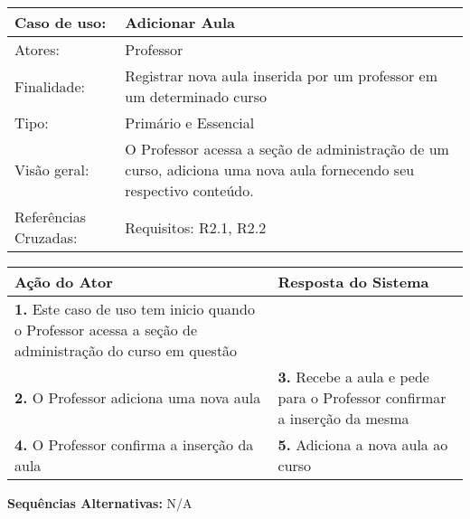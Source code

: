 \documentclass[12pt,a4paper,onecolumn,titlepage]{article}
\begin{document}
\begin{table}[h!]
\begin{center}
\begin{tabular}{p{2.5cm} p{9.5cm}}
Caso de uso: & \textbf{Adicionar Aula} \\ \hline
Atores: & Professor \\ \hline
Finalidade: & Registrar nova aula inserida por um professor em um determinado curso\\ \hline
Tipo: & Primário e Essencial \\ \hline
Visão geral: & O Professor acessa a seção de administração de um curso, adiciona uma nova aula fornecendo seu respectivo conteúdo. \\ \hline
Referências Cruzadas: & Requisitos: R2.1, R2.2\\

\end{tabular}
\end{center}
\end{table} 

\begin{center}
\def\arraystretch{1.1}
\begin{tabular}{|p{6cm}|p{6cm}|}

\hline
\textbf{Ação do Ator} & \textbf{Resposta do Sistema} \\ \hline
\textbf{1.} Este caso de uso tem inicio quando o Professor acessa a seção de administração do curso em questão  & \\ \hline
\textbf{2.} O Professor adiciona uma nova aula  & \textbf{3.} Recebe a aula e pede para o Professor confirmar a inserção da mesma  \\ \hline
\textbf{4.} O Professor confirma a inserção da aula  & \textbf{5.} Adiciona a nova aula ao curso\\ \hline
\end{tabular}
\end{center}

\textbf{Sequências Alternativas:} N/A

\newpage
\end{document}
